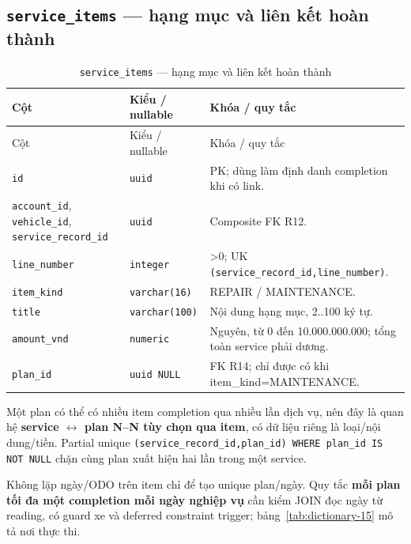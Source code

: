 \subsection{\texttt{service\_\allowbreak{}items} — hạng mục và liên kết hoàn thành}
\begin{smalltable}\begin{longtable}{L{3.0cm}L{3.2cm}L{8.2cm}}
\caption{\texttt{service\_\allowbreak{}items} — hạng mục và liên kết hoàn thành}\label{tab:dictionary-10}\\\toprule
Cột & Kiểu / nullable & Khóa / quy tắc\\\midrule\endfirsthead
\toprule Cột & Kiểu / nullable & Khóa / quy tắc\\\midrule\endhead
\texttt{id} & \texttt{uuid} & PK; dùng làm định danh completion khi có link.\\
\texttt{account\_\allowbreak{}id}, \texttt{vehicle\_\allowbreak{}id}, \texttt{service\_\allowbreak{}record\_\allowbreak{}id} & \texttt{uuid} & Composite FK R12.\\
\texttt{line\_\allowbreak{}number} & \texttt{integer} & >0; UK \texttt{(service\_\allowbreak{}record\_\allowbreak{}id,\allowbreak{}line\_\allowbreak{}number)}.\\
\texttt{item\_\allowbreak{}kind} & \texttt{varchar(16)} & REPAIR / MAINTENANCE.\\
\texttt{title} & \texttt{varchar(100)} & Nội dung hạng mục, 2..100 ký tự.\\
\texttt{amount\_\allowbreak{}vnd} & \texttt{numeric} & Nguyên, từ 0 đến 10.000.000.000; tổng toàn service phải dương.\\
\texttt{plan\_\allowbreak{}id} & \texttt{uuid NULL} & FK R14; chỉ được có khi item\_kind=MAINTENANCE.\\
\bottomrule\end{longtable}\end{smalltable}
Một plan có thể có nhiều item completion qua nhiều lần dịch vụ, nên đây là quan hệ \textbf{service $\leftrightarrow$ plan N–N tùy chọn qua item}, có dữ liệu riêng là loại/nội dung/tiền. Partial unique \texttt{(service\_\allowbreak{}record\_\allowbreak{}id,\allowbreak{}plan\_\allowbreak{}id) WHERE plan\_\allowbreak{}id IS NOT NULL} chặn cùng plan xuất hiện hai lần trong một service.\par
Không lặp ngày/ODO trên item chỉ để tạo unique plan/ngày. Quy tắc \textbf{mỗi plan tối đa một completion mỗi ngày nghiệp vụ} cần kiểm JOIN đọc ngày từ reading, có guard xe và deferred constraint trigger; bảng~\ref{tab:dictionary-15} mô tả nơi thực thi.\par
